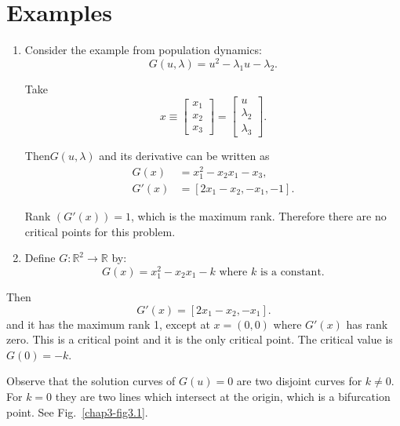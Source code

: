 \section{Examples}\label{chap3-sec3.3}

\begin{enumerate}
\renewcommand{\labelenumi}{(\theenumi)}
\item Consider the example from population dynamics:
$$
G(u, \lambda) = u^2 - \lambda_1 u - \lambda_2 .
$$

Take 
\begin{equation*}
x\equiv
\begin{bmatrix}
x_1 \\ x_2 \\ x_3   
\end{bmatrix}
=
\begin{bmatrix}
u \\ \lambda_2 \\ \lambda_3  
\end{bmatrix}.
\end{equation*}

Then\pageoriginale $G(u, \lambda)$ and its derivative can be written as 
\begin{align*}
G(x) & = x^2_1 -x_2 x_1 -x_3, \\
G'(x) &=  [2x_1 - x_2, -x_1, -1].
\end{align*}

Rank $(G'(x)) = 1$, which is the maximum rank. Therefore there are no
critical points for this problem. 

\item Define $G: \mathbb{R}^2 \rightarrow \mathbb{R}$ by:
$$
G(x) = x^2_1 -x_2 x_1 -k \text{ \ where $k$ is a constant.}
$$
 \end{enumerate}  

Then
$$
G'(x) = [2x_1 -x_2, -x_1].
$$
and it has the maximum rank 1, except at $x = (0,0)$ where $G'(x)$
has rank zero. This is a critical point and it is the only critical
point. The critical value is $G(0) = -k$. 
 
Observe that the solution curves of $G(u) = 0$ are two disjoint
curves for $k \neq 0$. For $k=0$ they are two lines which intersect
at the origin, which is a bifurcation point. See
Fig.~\ref{chap3-fig3.1}.  

